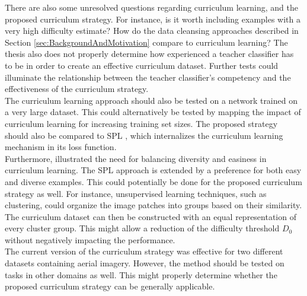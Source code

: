 There are also some unresolved questions regarding curriculum learning, and the proposed curriculum strategy. For instance, is it worth including examples with a very high difficulty estimate? How do the data cleansing approaches described in Section \ref{sec:BackgroundAndMotivation} compare to curriculum learning? The thesis also does not properly determine how experienced a teacher classifier has to be in order to create an effective curriculum dataset. Further tests could illuminate the relationship between the teacher classifier's competency and the effectiveness of the curriculum strategy.  \\

The curriculum learning approach should also be tested on a network trained on a very large dataset. This could alternatively be tested by mapping the impact of curriculum learning for increasing training set sizes. The proposed strategy should also be compared to \ac{SPL} \citep{Kumar_self_paced_learning}, which internalizes the curriculum learning mechanism in its loss function.\\

Furthermore, \cite{Lu_self-paced_learning_diversity} illustrated the need for balancing diversity and easiness in curriculum learning. The \ac{SPL} approach is extended by a preference for both easy and diverse examples. This could potentially be done for the proposed curriculum strategy as well. For instance, unsupervised learning techniques, such as clustering, could organize the image patches into groups based on their similarity. The curriculum dataset can then be constructed with an equal representation of every cluster group. This might allow a reduction of the difficulty threshold $D_0$ without negatively impacting the performance.\\

The current version of the curriculum strategy was effective for two different datasets containing aerial imagery. However, the method should be tested on tasks in other domains as well. This might properly determine whether the proposed curriculum strategy can be generally applicable.\\
 

